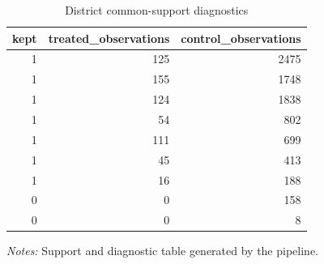 \begin{table}[!htbp] \centering
\caption{District common-support diagnostics}
\begin{tabular}{rrr}
\toprule
kept & treated\_observations & control\_observations \\
\midrule
1 & 125 & 2475 \\
1 & 155 & 1748 \\
1 & 124 & 1838 \\
1 & 54 & 802 \\
1 & 111 & 699 \\
1 & 45 & 413 \\
1 & 16 & 188 \\
0 & 0 & 158 \\
0 & 0 & 8 \\
\bottomrule
\end{tabular}

\begin{minipage}{0.98\textwidth}
\footnotesize \textit{Notes:} Support and diagnostic table generated by the pipeline.
\end{minipage}
\end{table}
